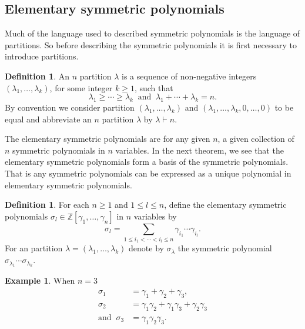 \documentclass{article}
\theoremstyle{plain}
\theoremstyle{definition}
\newtheorem{defn}[thm]{Definition}
\newtheorem{exam}[thm]{Example}
\numberwithin{thm}{section}
\begin{document}
	\subsection{Elementary symmetric polynomials}\label{sec:elementary}
	
		Much of the language used to described symmetric polynomials is the language of partitions.
		So before describing the symmetric polynomials it is first necessary to introduce partitions.
			
		\begin{defn}
			An $n$ partition $\lambda$ is a sequence of non-negative integers $(\lambda_1,\dots,\lambda_k)$, for some integer $k\geq 1$, such that
			\begin{equation*}
				\lambda_1\geq\cdots\geq\lambda_k \;\; \text{and} \;\; \lambda_1+\cdots+\lambda_k=n.
			\end{equation*}
			By convention we consider partition $(\lambda_1,\dots,\lambda_k)$ and $(\lambda_1,\dots,\lambda_k,0,\dots,0)$ to be equal
			and abbreviate an $n$ partition $\lambda$ by $\lambda \vdash n$.
		\end{defn}
		
		The elementary symmetric polynomials are for any given $n$, a given collection of $n$ symmetric polynomials in $n$ variables.
		In the next theorem, we see that the elementary symmetric polynomials form a basis of the symmetric polynomials.
		That is any symmetric polynomials can be expressed as a unique polynomial in elementary symmetric polynomials.	
				
		\begin{defn}\label{defn:ElementarySymmetric}
			For each $n\geq 1$ and $1\leq l \leq n$, define the elementary symmetric polynomials $\sigma_l\in\mathbb{Z}[\gamma_1,\dots,\gamma_n]$ in $n$ variables by
			\begin{equation*}
				\sigma_l=\sum_{1\leq i_1<\cdots<i_l\leq n}{\gamma_{i_1}\cdots\gamma_{i_l}}.
			\end{equation*}
			For an partition $\lambda=(\lambda_1,\dots,\lambda_k)$ denote by $\sigma_\lambda$ the symmetric polynomial $\sigma_{\lambda_1}\cdots\sigma_{\lambda_k}$.
		\end{defn}
		
		\begin{exam}
			When $n=3$
			\begin{align*}
											\sigma_1&=\gamma_1+\gamma_2+\gamma_3,\\
											\sigma_2&=\gamma_1\gamma_2+\gamma_1\gamma_3+\gamma_2\gamma_3\\
				\text{and}\;\;\sigma_3&=\gamma_1\gamma_2\gamma_3.
			\end{align*}
		\end{exam}
		
\end{document}
